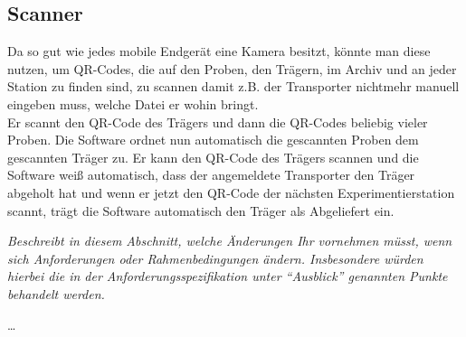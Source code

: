 \documentclass[enabledeprecatedfontcommands,fontsize=12pt,paper=a4,twoside]{scrartcl}
\begin{document}
\subsection{Scanner}
{
Da so gut wie jedes mobile Endgerät eine Kamera besitzt, könnte man diese nutzen, um QR-Codes, die auf den Proben, den Trägern, im Archiv und an jeder Station zu finden sind, zu scannen damit z.B. der Transporter nichtmehr manuell eingeben muss, welche Datei er wohin bringt. \\
Er scannt den QR-Code des Trägers und dann die QR-Codes beliebig vieler Proben. Die Software ordnet nun automatisch die gescannten Proben dem gescannten Träger zu. 
Er kann den QR-Code des Trägers scannen und die Software weiß automatisch, dass der angemeldete Transporter den Träger abgeholt hat und wenn er jetzt den QR-Code der nächsten Experimentierstation scannt, trägt die Software automatisch den Träger als Abgeliefert ein. 
}

{\it
  Beschreibt in diesem Abschnitt, welche Änderungen Ihr
  vornehmen müsst, wenn sich Anforderungen oder Rahmenbedingungen
  ändern. Insbesondere würden hierbei die in der
  Anforderungsspezifikation unter "`Ausblick"' genannten
  Punkte behandelt werden.}

\dots
\end{document}
